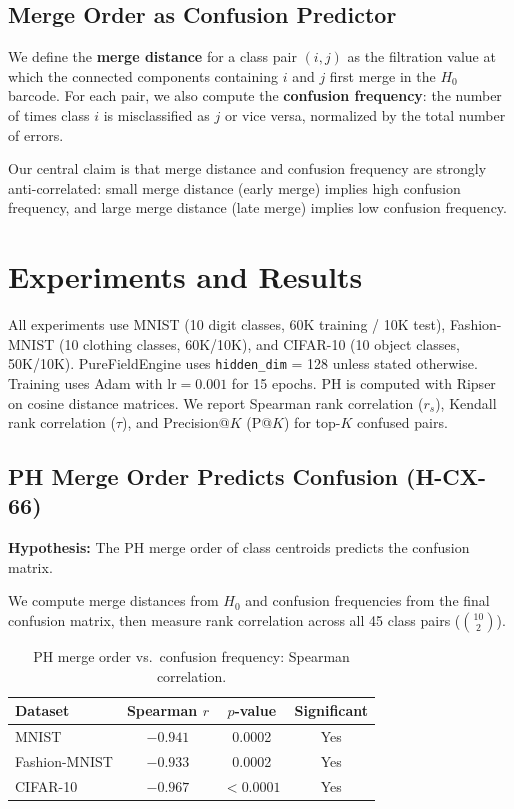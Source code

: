 \documentclass[11pt,a4paper]{article}
\begin{document}
\subsection{Merge Order as Confusion Predictor}

We define the \textbf{merge distance} for a class pair $(i, j)$ as the filtration value at which the connected components containing $i$ and $j$ first merge in the $H_0$ barcode. For each pair, we also compute the \textbf{confusion frequency}: the number of times class $i$ is misclassified as $j$ or vice versa, normalized by the total number of errors.

Our central claim is that merge distance and confusion frequency are strongly anti-correlated: small merge distance (early merge) implies high confusion frequency, and large merge distance (late merge) implies low confusion frequency.

\section{Experiments and Results}
\label{sec:experiments}

All experiments use MNIST (10 digit classes, 60K training / 10K test), Fashion-MNIST (10 clothing classes, 60K/10K), and CIFAR-10 (10 object classes, 50K/10K). PureFieldEngine uses \texttt{hidden\_dim} = 128 unless stated otherwise. Training uses Adam with $\text{lr} = 0.001$ for 15 epochs. PH is computed with Ripser on cosine distance matrices. We report Spearman rank correlation ($r_s$), Kendall rank correlation ($\tau$), and Precision@$K$ (P@$K$) for top-$K$ confused pairs.

\subsection{PH Merge Order Predicts Confusion (H-CX-66)}

\textbf{Hypothesis:} The PH merge order of class centroids predicts the confusion matrix.

We compute merge distances from $H_0$ and confusion frequencies from the final confusion matrix, then measure rank correlation across all 45 class pairs ($\binom{10}{2}$).

\begin{table}[htbp]
\centering
\caption{PH merge order vs.\ confusion frequency: Spearman correlation.}
\label{tab:merge-confusion}
\begin{tabular}{lccc}
\toprule
Dataset & Spearman $r$ & $p$-value & Significant \\
\midrule
MNIST         & $-0.941$ & 0.0002    & Yes \\
Fashion-MNIST & $-0.933$ & 0.0002    & Yes \\
CIFAR-10      & $-0.967$ & $< 0.0001$ & Yes \\
\bottomrule
\end{tabular}
\end{table}
\end{document}
